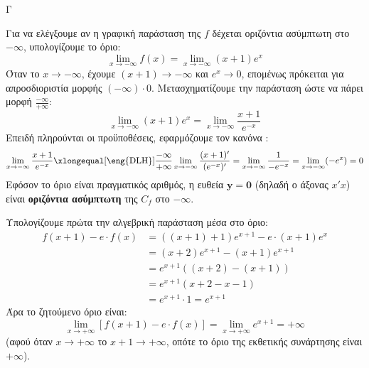\begin{thema}{Γ}
\begin{erwthma}
\item Για να ελέγξουμε αν η γραφική παράσταση της $f$ δέχεται οριζόντια ασύμπτωτη στο $-\infty$, υπολογίζουμε το όριο:
\[ \lim_{x \to -\infty} f(x) = \lim_{x \to -\infty} (x+1) e^x \]
Όταν το $x \to -\infty$, έχουμε $(x+1) \to -\infty$ και $e^x \to 0$, επομένως πρόκειται για απροσδιοριστία μορφής $(-\infty) \cdot 0$.
Μετασχηματίζουμε την παράσταση ώστε να πάρει μορφή $\frac{-\infty}{+\infty}$:
\[ \lim_{x \to -\infty} (x+1) e^x = \lim_{x \to -\infty} \frac{x+1}{e^{-x}} \]
Επειδή πληρούνται οι προϋποθέσεις, εφαρμόζουμε τον κανόνα :
\[ \lim_{x \to -\infty} \frac{x+1}{e^{-x}} \xlongequal[\text{\eng{DLH}}]{\frac{-\infty}{+\infty}} \lim_{x \to -\infty} \frac{(x+1)'}{(e^{-x})'} = \lim_{x \to -\infty} \frac{1}{-e^{-x}} = \lim_{x \to -\infty} (-e^x) = 0 \]
Εφόσον το όριο είναι πραγματικός αριθμός, η ευθεία $\boldsymbol{y = 0}$ (δηλαδή ο άξονας $x'x$) είναι \textbf{οριζόντια ασύμπτωτη} της $C_f$ στο $-\infty$.

\item Υπολογίζουμε πρώτα την αλγεβρική παράσταση μέσα στο όριο:
\begin{align*}
f(x+1) - e \cdot f(x) &= ( (x+1) + 1 ) e^{x+1} - e \cdot (x+1) e^x \\
&= (x+2) e^{x+1} - (x+1) e^{x+1} \\
&= e^{x+1} \left( (x+2) - (x+1) \right) \\
&= e^{x+1} (x + 2 - x - 1) \\
&= e^{x+1} \cdot 1 = e^{x+1}
\end{align*}
Άρα το ζητούμενο όριο είναι:
\[ \lim_{x \to +\infty} \left[ f(x+1) - e \cdot f(x) \right] = \lim_{x \to +\infty} e^{x+1} = \boldsymbol{+\infty} \]
(αφού όταν $x \to +\infty$ το $x+1 \to +\infty$, οπότε το όριο της εκθετικής συνάρτησης είναι $+\infty$).
\end{erwthma}
\end{thema}
